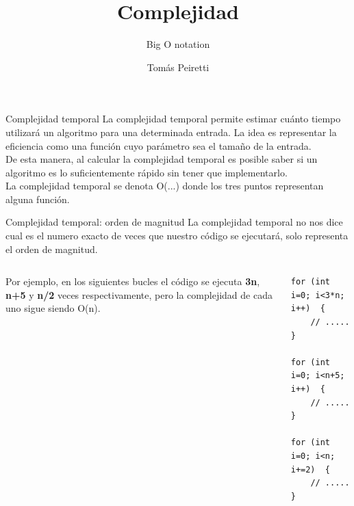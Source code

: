 \documentclass[12pt]{beamer}
\title{Complejidad}
\subtitle{Big O notation}
\author{Tomás Peiretti}
\date{}
\begin{document}
\maketitle

\begin{frame}{Complejidad temporal}
    La \alert{complejidad temporal} permite estimar cuánto tiempo utilizará un algoritmo para una determinada entrada. La idea es representar la \alert{eficiencia} como una función cuyo parámetro sea el tamaño de la entrada. \\
    \medskip
    De esta manera, al calcular la complejidad temporal es posible \alert{saber si un algoritmo es lo suficientemente rápido} sin tener que implementarlo. \\
    \medskip
    La complejidad temporal se denota \alert{O(...)} donde los tres puntos representan alguna función.
\end{frame}

\begin{frame}[fragile]{Complejidad temporal: orden de magnitud}
    La complejidad temporal no nos dice cual es el numero exacto de veces que nuestro código se ejecutará, solo representa el orden de magnitud. \\
    \medskip
    \begin{columns}
        Por ejemplo, en los siguientes bucles el código se ejecuta \textbf{3n}, \textbf{n+5} y \textbf{n/2} veces respectivamente, pero la complejidad de cada uno sigue siendo \alert{O(n)}.
        \begin{lstlisting}[basicstyle=\tiny]
for (int i=0; i<3*n; i++)  {
    // .....
} 

for (int i=0; i<n+5; i++)  {
    // .....
}

for (int i=0; i<n; i+=2)  {
    // .....
}
\end{lstlisting}
    \end{columns}
\end{frame}
\end{document}
